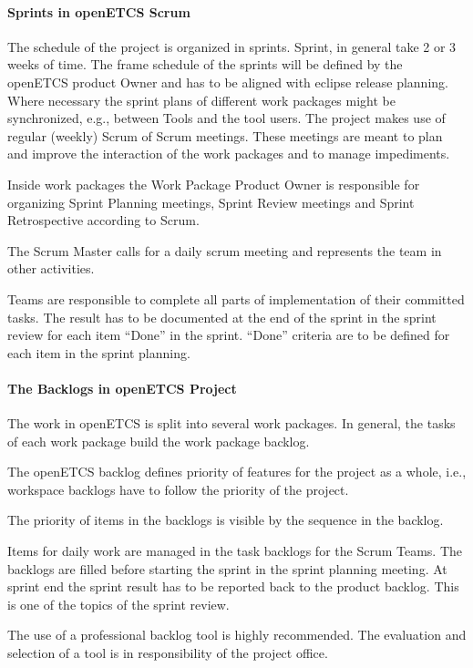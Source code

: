 \documentclass{template/openetcs_article}
\begin{document}
\paragraph{Sprints in openETCS Scrum}
The schedule of the project is organized in sprints. Sprint, in general take 2 or 3 weeks of time. The frame schedule of the sprints will be defined by the openETCS product Owner and has to be aligned with eclipse release planning. Where necessary the sprint plans of different work packages might be synchronized, e.g., between Tools and the tool users. The project makes use of regular (weekly) Scrum of Scrum meetings. These meetings are meant to plan and improve the interaction of the work packages and to manage impediments.

Inside work packages the Work Package Product Owner is responsible for organizing Sprint Planning meetings, Sprint Review meetings and Sprint Retrospective according to Scrum.

The Scrum Master calls for a daily scrum meeting and represents the team in other activities.

Teams are responsible to complete all parts of implementation of their committed tasks. The result has to be documented at the end of the sprint in the sprint review for each item ``Done'' in the sprint. ``Done'' criteria are to be defined for each item in the sprint planning.



\paragraph{The Backlogs in openETCS Project}
The work in openETCS is split into several work packages. In general, the tasks of each work package build the work package backlog. 

The openETCS backlog defines priority of features for the project as a whole, i.e., workspace backlogs have to follow the priority of the project.

The priority of items in the backlogs is visible by the sequence in the backlog.

Items for daily work are managed in the task backlogs for the Scrum Teams. The backlogs are filled before starting the sprint in the sprint planning meeting. At sprint end the sprint result has to be reported back to the product backlog. This is one of the topics of the sprint review. 

The use of a professional backlog tool is highly recommended. The evaluation and selection of a tool is in responsibility of the project office. 
\end{document}
